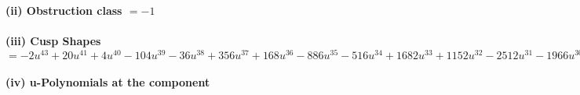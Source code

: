 \documentclass[1p]{elsarticle_modified}
\theoremstyle{definition}
\begin{document}
\flushleft \textbf{(ii) Obstruction class $= -1$}\\~\\
\flushleft \textbf{(iii) Cusp Shapes $= -2 u^{43}+20 u^{41}+4 u^{40}-104 u^{39}-36 u^{38}+356 u^{37}+168 u^{36}-886 u^{35}-516 u^{34}+1682 u^{33}+1152 u^{32}-2512 u^{31}-1966 u^{30}+3018 u^{29}+2658 u^{28}-2988 u^{27}-2940 u^{26}+2506 u^{25}+2762 u^{24}-1828 u^{23}-2288 u^{22}+1160 u^{21}+1706 u^{20}-614 u^{19}-1138 u^{18}+234 u^{17}+680 u^{16}-8 u^{15}-356 u^{14}-126 u^{13}+132 u^{12}+148 u^{11}+30 u^{10}-90 u^9-66 u^8+36 u^6+8 u^5+12 u^4-4 u^3-4 u^2-12 u+2$}\\~\\
\newpage\renewcommand{\arraystretch}{1}
\flushleft \textbf{(iv) u-Polynomials at the component}\newline \\
\end{document}
